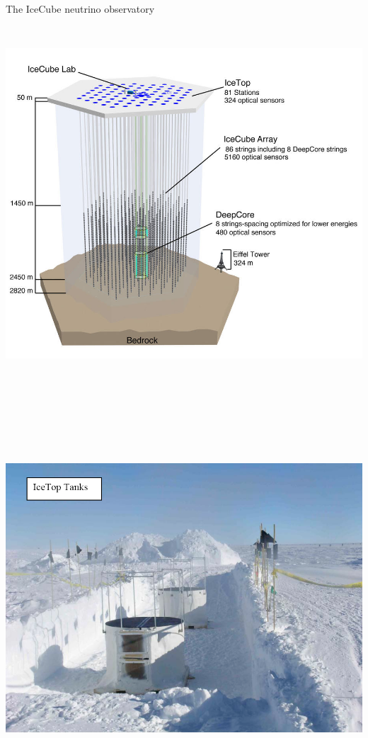 \Tr
\onecolumn
\begin{center}
{\blue The IceCube neutrino observatory}\\[3mm] 
\includegraphics[keepaspectratio,height=14cm]{ic86-dc}
\end{center}

\Tr
\onecolumn
\begin{center}
\includegraphics[keepaspectratio,height=14.5cm]{icetop-snow}
\end{center}

